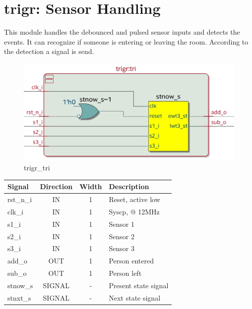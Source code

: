 \documentclass[12pt,a4 paper] {report}
\begin{document}
\newpage

\section{trigr: Sensor Handling}
This module handles the debounced and pulsed sensor inputs and detects the events. It can recognize if someone is entering 
or leaving the room. According to the detection a signal is send.
\begin{figure}[h]
	\centering	
	\includegraphics[scale=0.2]{../png/trigr_tri.png}
	\caption{trigr\_tri}
\end{figure}
\begin{center}
	\begin{tabular}{ | p{2cm} | c | c | p{5cm} |}
		\hline
		\textbf{Signal} & \textbf{Direction} & \textbf{Width} & \textbf{Description} \\
		\hline
		\hline
		rst\_n\_i & IN & 1 & Reset, active low \\
		\hline
		clk\_i & IN & 1 & Syscp, @ 12MHz \\
		\hline
		s1\_i & IN & 1 & Sensor 1 \\
		\hline
		s2\_i & IN & 1 & Sensor 2 \\
		\hline
		s3\_i & IN & 1 & Sensor 3 \\
		\hline
		add\_o & OUT & 1 & Person entered \\
		\hline
		sub\_o & OUT & 1 & Person left \\
		\hline
		\hline
		stnow\_s & SIGNAL & - & Present state signal \\
		\hline
		stnxt\_s & SIGNAL & - & Next state signal \\
		\hline

	\end{tabular}
\end{center}

\newpage
\end{document}
